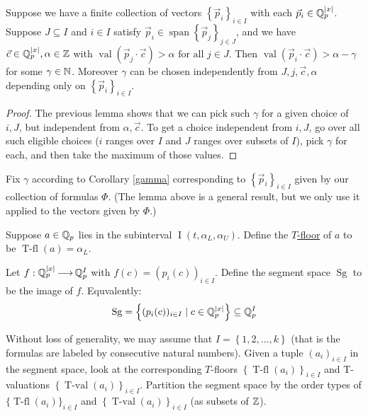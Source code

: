 \documentclass{amsart}
\newcommand{\curly}[1]{\left\{#1\right\}}
\DeclareMathOperator{\Sg}{Sg}
\DeclareMathOperator{\vecspan}{span}
\DeclareMathOperator{\val}{val}
\DeclareMathOperator{\tval}{T-val}
\DeclareMathOperator{\tfl}{T-fl}
\DeclareMathOperator{\inti}{I}
\newcommand{\defn}{\underline}
\newcommand{\interval}{\inti(t, \alpha_L, \alpha_U)}
\begin{document}
\begin{Corollary}	 \label{gamma}
  Suppose we have a finite collection of vectors $\curly{\vec p_i}_{i \in I}$ with each $\vec p_i \in \mathbb{Q}_p^{|x|}$.
  Suppose $J \subseteq I$ and $i \in I$ satisfy $\vec p_i \in \vecspan \curly{\vec p_j}_{j \in J}$,
  and we have $\vec c \in \mathbb{Q}_p^{|x|}, \alpha \in \mathbb{Z}$ with $\val(\vec p_j \cdot \vec c) > \alpha \text{ for all } j \in J$.
  Then $\val(\vec p_i \cdot \vec c) > \alpha - \gamma$
  for some $\gamma \in \mathbb{N}$.
  Moreover $\gamma$ can be chosen independently from $J, j, \vec c, \alpha$ depending only on $\curly{\vec p_i}_{i \in I}$.
\end{Corollary}
\begin{proof}
  The previous lemma shows that we can pick such $\gamma$ for a given choice of $i, J$, but independent from $\alpha, \vec c$.
  To get a choice independent from $i, J$, go over all such eligible choices 
  ($i$ ranges over $I$ and $J$ ranges over subsets of $I$),
  pick $\gamma$ for each, and then take the maximum of those values.  
\end{proof}

Fix $\gamma$ according to Corollary \ref{gamma} corresponding to $\curly{\vec p_i}_{i \in I}$ given by our collection of formulas $\Phi$.
(The lemma above is a general result, but we only use it applied to the vectors given by $\Phi$.)

\begin{Definition}
  Suppose $a \in \mathbb{Q}_p$ lies in the subinterval $\interval$.
  Define the \defn{$T$-floor} of $a$ to be $\tfl(a) = \alpha_L$.
\end{Definition}

\begin{Definition}
  Let $f: \mathbb{Q}_p^{|x|} \operatorname{\longrightarrow} \mathbb{Q}_p^I$ with $f(c) = (p_i(c))_{i \in I}$.
  Define the segment space $\Sg$ to be the image of $f$.
  Equvalently:
  \begin{align*}
    \Sg = \curly{(p_i(c))_{i \in I} \mid c \in \Q_p^{|x|}} \subseteq \Q_p^I
  \end{align*}
\end{Definition}

Without loss of generality, we may assume that $I = \curly{1,2, \ldots, k}$ (that is the formulas are labeled by consecutive natural numbers).
Given a tuple $(a_i)_{i\in I}$ in the segment space,
look at the corresponding $T$-floors $\curly{\tfl(a_i)}_{i\in I}$ and T-valuations $\curly{\tval(a_i)}_{i\in I}$.
Partition the segment space by the order types of $\{\tfl(a_i)\}_{i\in I}$ and $\curly{\tval(a_i)}_{i\in I}$ (as subsets of $\mathbb{Z}$).
\end{document}
